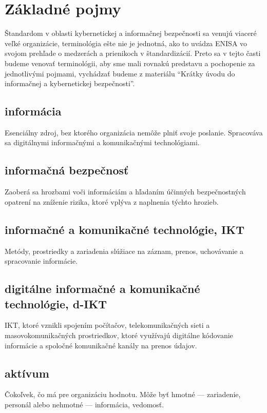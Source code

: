 \section{Základné pojmy}

Štandardom v oblasti kybernetickej a informačnej bezpečnosti sa venujú viaceré veľké organizácie, terminológia ešte nie je jednotná, ako to uvádza ENISA
vo svojom prehľade o medzerách a prienikoch v štandardizácií\cite{enisa_cybersecurity_definition_gaps}. Preto sa v tejto časti budeme venovať terminológii,
aby sme mali rovnakú predstavu a pochopenie za jednotlivými pojmami, vychádzať budeme z materiálu \enquote{Krátky úvodu do informačnej a kybernetickej
bezpečnosti}\cite{KUdIKBaMVS}.

\subsection*{informácia}
Esenciálny zdroj, bez ktorého organizácia nemôže plniť svoje poslanie. Spracováva sa digitálnymi informačnými a komunikačnými technológiami.

\subsection*{informačná bezpečnosť}
Zaoberá sa hrozbami voči informáciám a hľadaním účinných bezpečnostných opatrení na zníženie rizika, ktoré vplýva z naplnenia týchto hrozieb.

\subsection*{informačné a komunikačné technológie, IKT}
Metódy, prostriedky a zariadenia slúžiace na záznam, prenos, uchovávanie a spracovanie informácie.

\subsection*{digitálne informačné a komunikačné technológie, d-IKT}
IKT, ktoré vznikli spojením počítačov, telekomunikačných sieti a masovokomunikačných prostriedkov, ktoré využívajú digitálne kódovanie informácie
a spoločné komunikačné kanály na prenos údajov.

\subsection*{aktívum}
Čokoľvek, čo má pre organizáciu hodnotu. Môže byť hmotné --- zariadenie, personál alebo nehmotné --- informácia, vedomosť.

